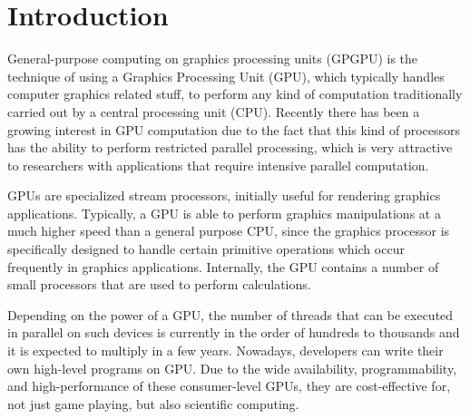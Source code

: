 \documentclass[review]{elsarticle}
\begin{document}




\section{Introduction}
\label{sec:intro}

General-purpose computing on graphics processing units (GPGPU) is the technique of using a Graphics Processing Unit (GPU), which typically handles computer graphics related stuff,
to perform any kind of computation traditionally carried out by a central processing unit (CPU). Recently there has been a growing interest in GPU computation due to the fact that this kind of processors has the ability to perform restricted parallel processing, which is very attractive to researchers with applications that require intensive parallel computation. 

GPUs are specialized stream processors, initially useful for rendering graphics applications. Typically, a GPU is able to perform graphics manipulations at a much higher speed than a general purpose CPU, since the graphics processor is specifically designed to handle certain primitive operations which occur frequently in graphics applications. Internally, the GPU contains a number of small processors that are used to perform calculations. 

Depending on the power of a GPU, the number of threads that can be executed in parallel on such devices is currently in the order of hundreds to thousands and it is expected to multiply in a few years. Nowadays, developers can write their own high-level programs on GPU. Due to the wide availability, programmability, and high-performance of these consumer-level GPUs, they are cost-effective for, not just game playing, but also scientific computing.
\end{document}
